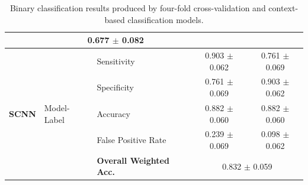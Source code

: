 \begin{table}[ht]
\begin{tabular}{l|llcc}
                                & \multicolumn{2}{c}{0.677 $\pm$ 0.082} \\ \midrule
\multirow{5}{*}{\textbf{SCNN}}
  & \multirow{5}{*}{Model-Label}
      & Sensitivity            & 0.903 $\pm$ 0.062 & 0.761 $\pm$ 0.069 \\
  &   & Specificity            & 0.761 $\pm$ 0.069 & 0.903 $\pm$ 0.062 \\
  &   & Accuracy               & 0.882 $\pm$ 0.060 & 0.882 $\pm$ 0.060 \\
  &   & False Positive Rate    & 0.239 $\pm$ 0.069 & 0.098 $\pm$ 0.062 \\
  &   & \textbf{Overall Weighted Acc.}
                                & \multicolumn{2}{c}{0.832 $\pm$ 0.059} \\ 
    \bottomrule
  \end{tabular}
  \caption{Binary classification results produced by four-fold cross-validation and context-based classification models.}
  \label{tab:binary_results_full_context}
\end{table}